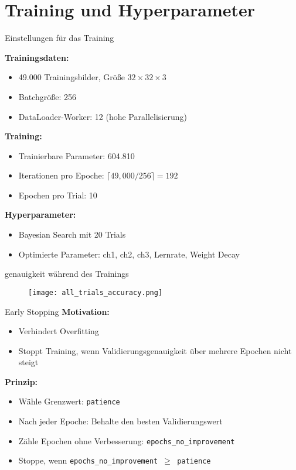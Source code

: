 \section{Training und Hyperparameter}

\begin{frame}{Einstellungen für das Training}

\textbf{Trainingsdaten:}
\begin{itemize}
    \item 49.000 Trainingsbilder, Größe $32 \times 32 \times 3$
    \item Batchgröße: 256
    \item DataLoader-Worker: 12 (hohe Parallelisierung)
\end{itemize}

\textbf{Training:}
\begin{itemize}
    \item Trainierbare Parameter: 604.810
    \item Iterationen pro Epoche: $\lceil 49{,}000 / 256 \rceil = 192$
    \item Epochen pro Trial: 10
\end{itemize}

\textbf{Hyperparameter:}
\begin{itemize}
    \item Bayesian Search mit 20 Trials
    \item Optimierte Parameter: ch1, ch2, ch3, Lernrate, Weight Decay
\end{itemize}
\end{frame}

\begin{frame}{genauigkeit während des Trainings}
\begin{figure}
    \centering
    \texttt{[image: all\_trials\_accuracy.png]}
\end{figure}
\end{frame}

\begin{frame}[fragile]{Early Stopping}
\textbf{Motivation:} 
\begin{itemize}
    \item Verhindert Overfitting
    \item Stoppt Training, wenn Validierungsgenauigkeit über mehrere Epochen nicht steigt
\end{itemize}

\textbf{Prinzip:}
\begin{itemize}
    \item Wähle Grenzwert: \texttt{patience}
    \item Nach  jeder Epoche: Behalte den besten Validierungswert
    \item Zähle Epochen ohne Verbesserung: \texttt{epochs\_no\_improvement}
    \item Stoppe, wenn \texttt{epochs\_no\_improvement $\ge$ patience}
\end{itemize}
\end{frame}

